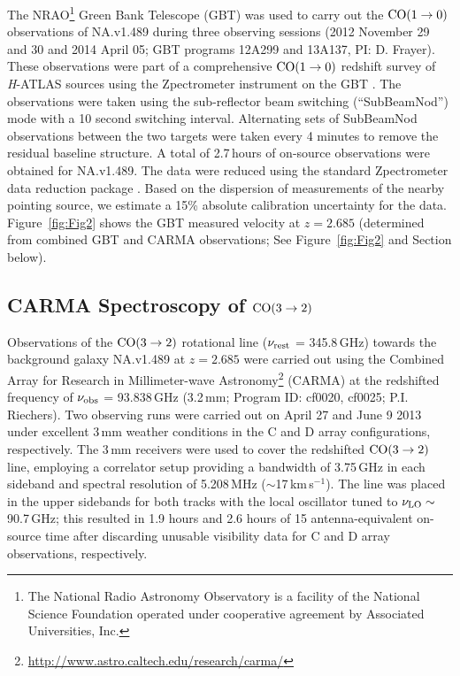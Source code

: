 \documentclass[iop,apj,useAMS,usenatbib]{emulateapj-rtx4}
\begin{document}
The NRAO\footnote{The National Radio Astronomy Observatory is a
facility of the National Science Foundation operated under cooperative
agreement by Associated Universities, Inc.} Green Bank Telescope (GBT)
was used to carry out the $\rm {CO (1 \rightarrow 0)}$ observations of NA.v1.489 during
three observing sessions (2012 November 29 and 30 and 2014 April 05; GBT
programs 12A299 and 13A137, PI: D. Frayer). These observations were
part of a comprehensive $\rm {CO (1 \rightarrow 0)}$ redshift survey
of {\it H}-ATLAS sources
using the Zpectrometer instrument on the GBT \citep{Frayer2011,
  Harris2012}. The observations were taken using the
sub-reflector beam switching (``SubBeamNod'') mode with a 10 second
switching interval.  Alternating sets of SubBeamNod observations
between the two targets were taken every 4 minutes to remove the
residual baseline structure. A total of 2.7\,hours of on-source
observations were obtained for NA.v1.489. The data were reduced
using the standard Zpectrometer data reduction package
\citep{Harris2012}. Based on the dispersion of measurements of the nearby
pointing source, we estimate a 15\% absolute calibration uncertainty
for the data. Figure~\ref{fig:Fig2} shows the GBT measured velocity
at $z=2.685$ (determined from combined GBT and CARMA observations; See
Figure~\ref{fig:Fig2} and Section below).


\subsection {CARMA Spectroscopy of $\rm {CO (3 \rightarrow 2)}$}

Observations of the $\rm {CO (3 \rightarrow 2)}$ rotational line
($\nu_{\rm rest}$ = 345.8\,GHz) towards the background galaxy
NA.v1.489 at $z = 2.685$ were carried out using the Combined Array for
Research in Millimeter-wave
Astronomy\footnote{\url{http://www.astro.caltech.edu/research/carma/}}
(CARMA) at the redshifted frequency of $\nu_{\rm obs}$ = 93.838\,GHz
(3.2\,mm; Program ID: cf0020, cf0025; P.I. Riechers).
Two observing runs were carried out on April 27 and June 9 2013 under excellent 3\,mm weather conditions in the C and D array configurations, respectively. The 3\,mm receivers were used to cover the redshifted $\rm {CO (3 \rightarrow 2)}$ line, employing a correlator setup providing a bandwidth of 3.75\,GHz in each sideband and spectral resolution of 5.208\,MHz ($\sim$17\,km\,s$^{-1}$). The line was placed in the
upper sidebands for both tracks with the local oscillator tuned to $\nu_{\rm LO}\sim$ 90.7\,GHz; this resulted in 1.9 hours and 2.6 hours of 15 antenna-equivalent on-source time after discarding unusable visibility data for C and D array observations, respectively.
\end{document}
